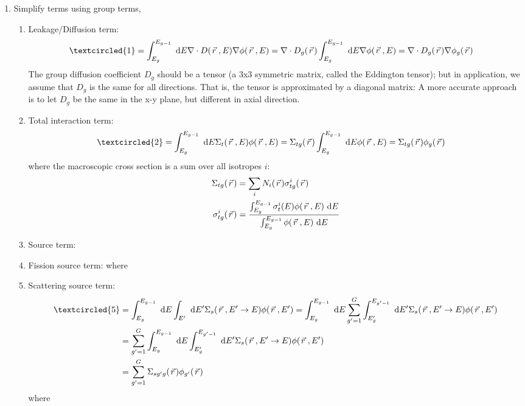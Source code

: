 \documentclass{school-22.211-notes}
\begin{document}
\begin{enumerate}
\item Simplify terms using group terms,
  \begin{enumerate}
  \item Leakage/Diffusion term: 
    \begin{align}
      \textcircled{1} &=\int_{E_g}^{E_{g-1}} \dE \divergence D(\vecr, E) \gradient \phi(\vecr, E) =  \divergence D_g(\vecr) \int_{E_g}^{E_{g-1}} \dE \gradient \phi(\vecr, E) = \divergence D_g (\vecr) \gradient \phi_g(\vecr) 
    \end{align}
    The group diffusion coefficient $D_g$ should be a tensor (a 3x3 symmetric matrix, called the Eddington tensor); but in application, we assume that $D_g$ is the same for all directions. That is, the tensor is approximated by a diagonal matrix: 
    A more accurate approach is to let $D_g$ be the same in the x-y plane, but different in axial direction. 
  \item Total interaction term: 
    \begin{align}
      \textcircled{2} &= \int_{E_g}^{E_{g-1}} \dE \Sigma_t(\vecr, E) \phi(\vecr, E) = \Sigma_{tg}(\vecr) \int_{E_g}^{E_{g-1}} \dE \phi(\vecr, E) = \Sigma_{tg} (\vecr) \phi_g(\vecr) 
    \end{align}
    where the macroscopic cross section is a sum over all isotropes $i$:
    \begin{align}
      \Sigma_{tg}(\left.\vec{r}\right.) &= \displaystyle\sum_{i} N_i(\left.\vec{r}\right.) \sigma_{tg}^i (\left.\vec{r}\right.) \\
      \sigma_{tg}^i (\left.\vec{r}\right.) &= \frac{\int_{E_g}^{E_{g-1}} \sigma_t^i (E) \phi(\left.\vec{r}\right., E) \mbox{ }\mathrm{d} E }{\int_{E_g}^{E_{g-1}} \phi(\left.\vec{r}\right., E) \mbox{ }\mathrm{d} E}
    \end{align}
  \item Source term: 
  \item Fission source term: 
        where 

  \item Scattering source term: 
  \begin{align}
    \textcircled{5} &=\int_{E_g}^{E_{g-1}} \dE \int_{E'} \dE' \Sigma_s(\vecr, E'\to E) \phi(\vecr, E') = \int_{E_g}^{E_{g-1}} \dE \Sum_{g'=1}^G \int_{E_g'}^{E_{g'-1}} \dE' \Sigma_s(\vecr, E'\to E) \phi(\vecr, E') \\
    &= \Sum_{g'=1}^G \int_{E_g}^{E_{g-1}} \dE \int_{E_g'}^{E_{g'-1}} \dE' \Sigma_s(\vecr, E'\to E) \phi(\vecr, E') \\
    &= \Sum_{g'=1}^G \Sigma_{sg'g} (\vecr) \phi_{g'} (\vecr) 
  \end{align}
  where


\end{enumerate}
\end{enumerate}
\end{document}
